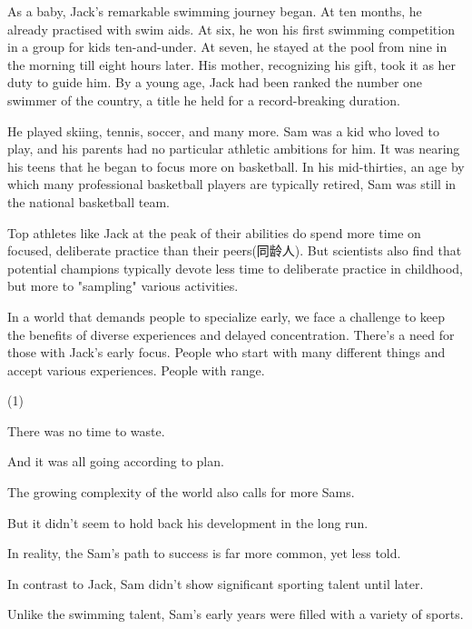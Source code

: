 \documentclass{英语试卷}
\begin{document}
\par As a baby, Jack's remarkable swimming journey began. At ten months, he already practised with swim aids. At six, he won his first swimming competition in a group for kids ten-and-under. At seven, he stayed at the pool from nine in the morning till eight hours later. His mother, recognizing his gift, took it as her duty to guide him.  By a young age, Jack had been ranked the number one swimmer of the country, a title he held for a record-breaking duration.\par
\par {} He played skiing, tennis, soccer, and many more. Sam was a kid who loved to play, and his parents had no particular athletic ambitions for him. It was nearing his teens that he began to focus more on basketball.  In his mid-thirties, an age by which many professional basketball players are typically retired, Sam was still in the national basketball team.\par
\par Top athletes like Jack at the peak of their abilities do spend more time on focused, deliberate practice than their peers(同龄人). But scientists also find that potential champions typically devote less time to deliberate practice in childhood, but more to "sampling" various activities. \par
\par In a world that demands people to specialize early, we face a challenge to keep the benefits of diverse experiences and delayed concentration. There's a need for those with Jack's early focus.  People who start with many different things and accept various experiences. People with range.\par
\begin{choices}(1)
  \item There was no time to waste.
  \item And it was all going according to plan.
  \item The growing complexity of the world also calls for more Sams.
  \item But it didn't seem to hold back his development in the long run.
  \item In reality, the Sam's path to success is far more common, yet less told.
  \item In contrast to Jack, Sam didn't show significant sporting talent until later.
  \item Unlike the swimming talent, Sam's early years were filled with a variety of sports.
\end{choices}
\end{document}
